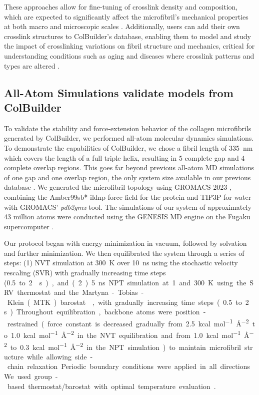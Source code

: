 \documentclass[10pt,letterpaper]{article}
\begin{document}
These approaches allow for fine-tuning of crosslink density and composition, which are expected to significantly affect the microfibril's mechanical properties at both macro and microscopic scales \cite{kwansa2016tensile, rennekamp2023collagen}. Additionally, users can add their own crosslink structures to ColBuilder's database, enabling them to model and study the impact of crosslinking variations on fibril structure and mechanics, critical for understanding conditions such as aging and diseases where crosslink patterns and types are altered \cite{monnier1996mechanism, snedeker2014role}.

\subsection*{All-Atom Simulations validate models from ColBuilder}\label{subsec4}

To validate the stability and force-extension behavior of the collagen microfibrils generated by ColBuilder, we performed all-atom molecular dynamics simulations. To demonstrate the capabilities of ColBuilder, we chose a fibril length of \SI{335}{\nano\meter} which covers the length of a full triple helix, resulting in 5 complete gap and 4 complete overlap regions. This goes far beyond previous all-atom MD simulations of one gap and one overlap region, the only system size available in our previous database \cite{obarska2021colbuilder}. We generated the microfibril topology using GROMACS 2023 \cite{van2005gromacs}, combining the Amber99sb*-ildnp force field \cite{best2009optimized, lindorff2010improved} for the protein and TIP3P for water with GROMACS' \textit{pdb2gmx} tool. The simulations of our system of approximately 43 million atoms were conducted using the GENESIS MD engine on the Fugaku supercomputer \cite{jung2024genesis,jung2021new}.

Our protocol began with energy minimization in vacuum, followed by solvation and further minimization. We then equilibrated the system through a series of steps: (1) NVT simulation at \SI{300}{\K} over \SI{10}{\nano\s} using the stochastic velocity rescaling (SVR) \cite{bussi2007accurate} with gradually increasing time steps (\SI{0.5} to \SI{2}{\s}), and (2) \SI{5}{\nano\s} NPT simulation at \SI{1}{} and \SI{300}{\K} using the SRV thermostat and the Martyna-Tobias-Klein (MTK) barostat \cite{martyna1994constant}, with gradually increasing time steps (\SI{0.5} to \SI{2}{\s}). Throughout equilibration, backbone atoms were position-restrained (force constant is decreased gradually from \SI{2.5}{kcal mol^{-1} \angstrom^{-2}} to \SI{1.0}{kcal mol^{-1} \angstrom^{-2}} in the NVT equilibration and from \SI{1.0}{kcal mol^{-1} \angstrom^{-2}} to \SI{0.3}{kcal mol^{-1} \angstrom^{-2}} in the NPT simulation) to maintain microfibril structure while allowing side-chain relaxation. Periodic boundary conditions were applied in all directions. We used group-based thermostat/barostat with optimal temperature evaluation \cite{jung2018optimal,jung2020group}.
\end{document}
